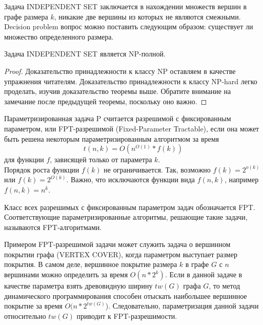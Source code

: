     \begin{Def}
        Задача \textsc{INDEPENDENT SET} заключается в нахождении множеств  вершин в графе размера $k$, никакие две вершины из которых не являются смежными. Decision problem вопрос можно поставить следующим образом: существует ли множество определенного размера.
    \end{Def}
    \begin{Thm}
        Задача \textsc{INDEPENDENT SET} является \textsc{NP}-полной. 
    \end{Thm}
    \begin{proof}
        Доказательство принадлежности к классу NP оставляем в качестве упражнения читателям. Доказательство принадлежности к классу NP-hard легко проделать, изучив доказательство теоремы выше. Обратите внимание на замечание после предыдущей теоремы, поскольку оно важно.
    \end{proof}
    
    
    \begin{Def}
        Параметризированная задача P считается разрешимой с фиксированным параметром, или FPT-разрешимой (Fixed-Parameter Tractable), если она может быть решена некоторым параметризированным алгоритмом за время
        $$t(n, k) = O(n^{O(1)} * f(k))$$
        для функции $f$, зависящей только от параметра $k$.\\ 
        Порядок роста функции $f(k)$ не ограничивается. Так, возможно $f(k) = 2^{o(k)}$ или $f(k) = 2^{O(k)}$. Важно, что исключаются функции вида $f(n, k)$, например $f(n, k) = n^k$.
    \end{Def}
    \begin{Rem}
        Класс всех разрешимых с фиксированным параметром задач обозначается FPT. Соответствующие параметризированные алгоритмы, решающие такие задачи, называются FPT-алгоритмами.
    \end{Rem}
    \begin{Example}
        Примером FPT-разрешимой задачи может служить задача о вершинном покрытии графа (VERTEX COVER), когда параметром выступает размер покрытия. В самом деле, вершинное покрытие размера $k$ в графе $G$ с $n$ вершинами можно определить за время $O(n*2^k)$. Если в данной задаче в качестве параметра взять древовидную ширину $tw(G)$ графа $G$, то метод динамического программирования способен отыскать наибольшее вершинное покрытие за время $O(n * 2^{tw(G)}$). Следовательно, параметризация данной задачи относительно $tw(G)$ приводит к FPT-разрешимости.
    \end{Example}

